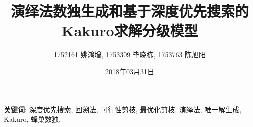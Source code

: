 \documentclass[a4paper,12pt]{article}
\title{演绎法数独生成和基于深度优先搜索的Kakuro求解分级模型}
\author{1752161 姚鸿增, 1753309 毕晓栋, 1753763 陈旭阳}
\affil{Team tsp}
\date{2018年03月31日}
\theoremstyle{definition}
\theoremstyle{Note}
\begin{document}
    \pagestyle{empty}
    \maketitle
    \newpage
    \tableofcontents
    \newpage

    

    \small{\textbf{关键词}:
        深度优先搜索, 回溯法, 可行性剪枝, 最优化剪枝, 演绎法, 唯一解生成, Kakuro, 蜂巢数独.}

    \thispagestyle{empty}
    \newpage

    \pagestyle{fancy}
    
\end{document}
